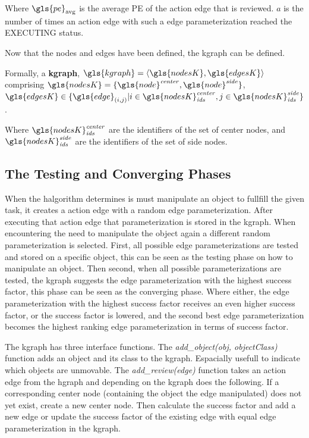 Where $\gls{pe}_\textrm{avg}$ is the average \ac{PE} of the action edge that is reviewed. $a$ is the number of times an action edge with such a edge parameterization reached the EXECUTING status.\bs

\noindent Now that the nodes and edges have been defined, the \ac{kgraph} can be defined.\bs

Formally, a \textbf{\acl{kgraph}}, $\gls{kgraph} = \left\langle \gls{nodesK}, \gls{edgesK} \right\rangle $
\\comprising $\gls{nodesK} = \{\gls{node}^{\mathit{center}}, \gls{node}^{\mathit{side}}\}$, \quad $\gls{edgesK} \in \{\gls{edge}_{(i,j)}| i \in \gls{nodesK}^\mathit{center}_\mathit{ids}, j \in \gls{nodesK}^\mathit{side}_\mathit{ids} \}$.\bs

Where $\gls{nodesK}^\mathit{center}_\mathit{ids}$ are the identifiers of the set of center nodes, and $\gls{nodesK}^\mathit{side}_\mathit{ids}$ are the identifiers of the set of side nodes.\bs

\subsection{The Testing and Converging Phases}
When the \ac{halgorithm} determines is must manipulate an object to fullfill the given task, it creates a action edge with a random edge parameterization. After executing that action edge that parameterization is stored in the \ac{kgraph}. When encountering the need to manipulate the object again a different random parameterization is selected. First, all possible edge parameterizations are tested and stored on a specific object, this can be seen as the testing phase on how to manipulate an object. Then second, when all possible parameterizations are tested, the \ac{kgraph} suggests the edge parameterization with the highest success factor, this phase can be seen as the converging phase. Where either, the edge parameterization with the highest success factor receives an even higher success factor, or the success factor is lowered, and the second best edge parameterization becomes the highest ranking edge parameterization in terms of success factor.\bs

The \ac{kgraph} has three interface functions. The \textit{add\_object(\gls{obj}, \gls{objectClass})} function adds an object and its class to the \ac{kgraph}. Espacially usefull to indicate which objects are unmovable. The \textit{add\_review(\gls{edge})} function takes an action edge from the \ac{hgraph} and depending on the \ac{kgraph} does the following. If a corresponding center node (containing the object the edge manipulated) does not yet exist, create a new center node. Then calculate the success factor and add a new edge or update the success factor of the existing edge with equal edge parameterization in the \ac{kgraph}.  

